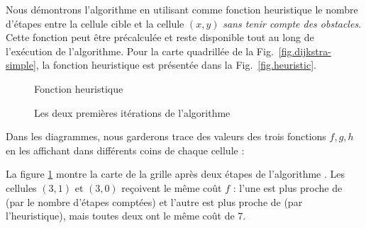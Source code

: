 Nous démontrons l'algorithme \astar{} en utilisant comme fonction heuristique le nombre d'étapes entre la cellule cible  et la cellule $(x,y)$ \emph{sans tenir compte des obstacles}. Cette fonction peut être précalculée et reste disponible tout au long de l'exécution de l'algorithme. Pour la carte quadrillée de la Fig.~\ref{fig.dijkstra-simple}, la fonction heuristique est présentée dans la Fig.~\ref{fig.heuristic}.

\begin{figure}
\begin{minipage}{.48\textwidth}
\caption{Fonction heuristique}
\label{fig.heuristic}
\end{minipage}
\hspace{\fill}
\begin{minipage}{.48\textwidth}
\caption{Les deux premières itérations de l'algorithme \astar{}}
\label{fig.astar2}
\end{minipage}
\end{figure}

Dans les diagrammes, nous garderons trace des valeurs des trois fonctions $f,g,h$ en les affichant dans différents coins de chaque cellule :

La figure \ref{fig.astar2} montre la carte de la grille après deux étapes de l'algorithme \astar{}. Les cellules $(3,1)$ et $(3,0)$ reçoivent le même coût $f$ : l'une est plus proche de  (par le nombre d'étapes comptées) et l'autre est plus proche de  (par l'heuristique), mais toutes deux ont le même coût de $7$.

